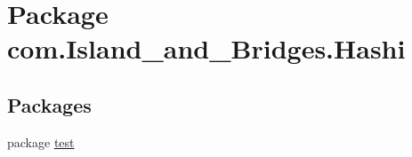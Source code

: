 \hypertarget{namespacecom_1_1_island__and___bridges_1_1_hashi}{}\section{Package com.\+Island\+\_\+and\+\_\+\+Bridges.\+Hashi}
\label{namespacecom_1_1_island__and___bridges_1_1_hashi}
\subsection*{Packages}
\begin{DoxyCompactItemize}
\item 
package \mbox{\hyperlink{namespacecom_1_1_island__and___bridges_1_1_hashi_1_1test}{test}}
\end{DoxyCompactItemize}
